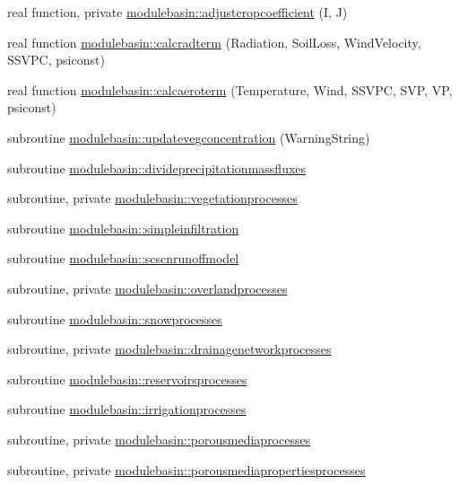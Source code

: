 \begin{DoxyCompactItemize}
real function, private \mbox{\hyperlink{namespacemodulebasin_af1790be65f99274cd923932448358912}{modulebasin\+::adjustcropcoefficient}} (I, J)
\item 
real function \mbox{\hyperlink{namespacemodulebasin_ac23d68c52a8a6bf444bd3ade576da5bb}{modulebasin\+::calcradterm}} (Radiation, Soil\+Loss, Wind\+Velocity, S\+S\+V\+PC, psiconst)
\item 
real function \mbox{\hyperlink{namespacemodulebasin_a466a2ecf0466b641fa24bb3e7847e37d}{modulebasin\+::calcaeroterm}} (Temperature, Wind, S\+S\+V\+PC, S\+VP, VP, psiconst)
\item 
subroutine \mbox{\hyperlink{namespacemodulebasin_a73f54ad66e54b432898b7261a7ba0969}{modulebasin\+::updatevegconcentration}} (Warning\+String)
\item 
subroutine \mbox{\hyperlink{namespacemodulebasin_a9ece838b83c6e7f083c271a95dbb460f}{modulebasin\+::divideprecipitationmassfluxes}}
\item 
subroutine, private \mbox{\hyperlink{namespacemodulebasin_a8345c242b1aed1c95c3779596054b89f}{modulebasin\+::vegetationprocesses}}
\item 
subroutine \mbox{\hyperlink{namespacemodulebasin_a7c47f016b2561d84dff67a1089c6c8f0}{modulebasin\+::simpleinfiltration}}
\item 
subroutine \mbox{\hyperlink{namespacemodulebasin_aa0b9eaedf50e780116499db9c0c35730}{modulebasin\+::scscnrunoffmodel}}
\item 
subroutine, private \mbox{\hyperlink{namespacemodulebasin_a4732062e95bfb4656920c8c89a412510}{modulebasin\+::overlandprocesses}}
\item 
subroutine \mbox{\hyperlink{namespacemodulebasin_a19824f46960f411ab472a65b6e3a9d2e}{modulebasin\+::snowprocesses}}
\item 
subroutine, private \mbox{\hyperlink{namespacemodulebasin_ab83592a7be03719e664d5eb440853228}{modulebasin\+::drainagenetworkprocesses}}
\item 
subroutine \mbox{\hyperlink{namespacemodulebasin_a2d6933b0b62fd8ddf365de6af6309c1c}{modulebasin\+::reservoirsprocesses}}
\item 
subroutine \mbox{\hyperlink{namespacemodulebasin_af1ae0091980128250cba6871d67a941c}{modulebasin\+::irrigationprocesses}}
\item 
subroutine, private \mbox{\hyperlink{namespacemodulebasin_aea9e156b76b5f88b91a7c975b33694ac}{modulebasin\+::porousmediaprocesses}}
\item 
subroutine, private \mbox{\hyperlink{namespacemodulebasin_abe3651d838039c895cf2f2192597ff85}{modulebasin\+::porousmediapropertiesprocesses}}

\end{DoxyCompactItemize}
